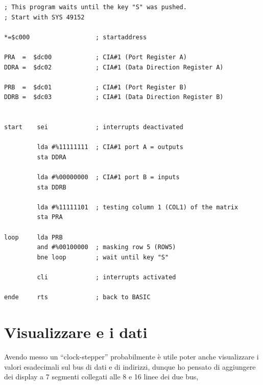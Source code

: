 \documentclass[final, ms, a4paper, 11pt]{memoir}
\newcommand\ddate{01.01.1970}
\begin{document}
\begin{centering}\begin{verbatim}
; This program waits until the key "S" was pushed.
; Start with SYS 49152

*=$c000                  ; startaddress 

PRA  =  $dc00            ; CIA#1 (Port Register A)
DDRA =  $dc02            ; CIA#1 (Data Direction Register A)

PRB  =  $dc01            ; CIA#1 (Port Register B)
DDRB =  $dc03            ; CIA#1 (Data Direction Register B)


start    sei             ; interrupts deactivated

         lda #%11111111  ; CIA#1 port A = outputs 
         sta DDRA             

         lda #%00000000  ; CIA#1 port B = inputs
         sta DDRB             

         lda #%11111101  ; testing column 1 (COL1) of the matrix
         sta PRA
            
loop     lda PRB
         and #%00100000  ; masking row 5 (ROW5) 
         bne loop        ; wait until key "S" 

         cli             ; interrupts activated

ende     rts             ; back to BASIC
\end{verbatim}\end{centering}

\renewcommand\ddate{16.03.2017}
\section{Visualizzare e i dati}
Avendo messo un ``clock-stepper'' probabilmente \`e utile poter anche
visualizzare i valori esadecimali sul bus di dati e di indirizzi, dunque ho
pensato di aggiungere dei display a 7 segmenti collegati alle 8 e 16 linee dei
due bus, 
\end{document}
